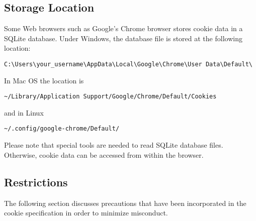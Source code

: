 \documentclass[a4paper, justified, notoc]{tufte-handout} %
\begin{document}
\subsection{Storage Location} %
\label{sub:storage_location}
Some Web browsers such as Google's Chrome browser stores cookie data in a SQLite database. 
Under Windows, the database file is stored at the following location:
\begin{Verbatim}
C:\Users\your_username\AppData\Local\Google\Chrome\User Data\Default\
\end{Verbatim}
In Mac OS the location is
\begin{Verbatim}
~/Library/Application Support/Google/Chrome/Default/Cookies
\end{Verbatim}
and in Linux
\begin{Verbatim}
~/.config/google-chrome/Default/
\end{Verbatim}
Please note that special tools are needed to read SQLite database files. Otherwise, cookie data can be accessed from within the browser.


\subsection{Restrictions} %
\label{sub:limitations}
The following section discusses precautions that have been incorporated in the cookie specification in order to minimize misconduct.
\end{document}
